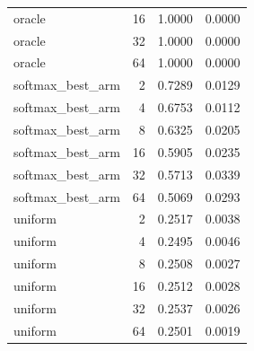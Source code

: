 \begin{table}[t]
\begin{tabular}{lrrr}
oracle & 16 & 1.0000 & 0.0000 \\
oracle & 32 & 1.0000 & 0.0000 \\
oracle & 64 & 1.0000 & 0.0000 \\
softmax\_best\_arm & 2 & 0.7289 & 0.0129 \\
softmax\_best\_arm & 4 & 0.6753 & 0.0112 \\
softmax\_best\_arm & 8 & 0.6325 & 0.0205 \\
softmax\_best\_arm & 16 & 0.5905 & 0.0235 \\
softmax\_best\_arm & 32 & 0.5713 & 0.0339 \\
softmax\_best\_arm & 64 & 0.5069 & 0.0293 \\
uniform & 2 & 0.2517 & 0.0038 \\
uniform & 4 & 0.2495 & 0.0046 \\
uniform & 8 & 0.2508 & 0.0027 \\
uniform & 16 & 0.2512 & 0.0028 \\
uniform & 32 & 0.2537 & 0.0026 \\
uniform & 64 & 0.2501 & 0.0019 \\
\bottomrule
\end{tabular}
\end{table}

